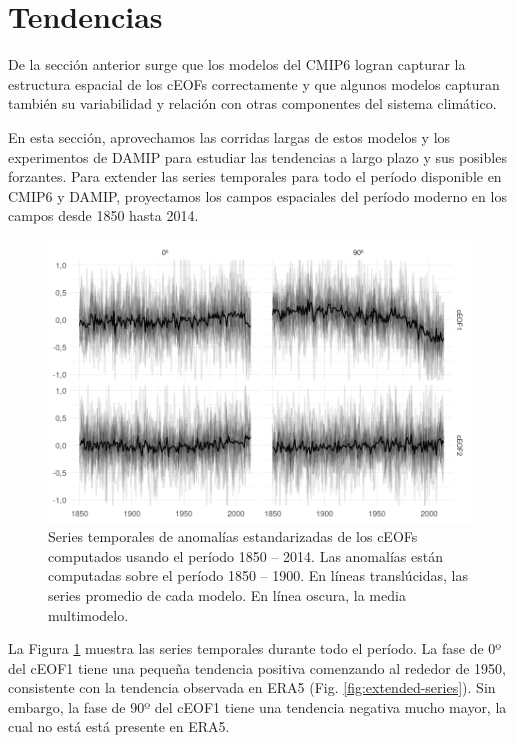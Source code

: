 \documentclass[12pt,oneside,a4paper]{reedthesis}
\begin{document}
\hypertarget{tendencias}{%
\section{Tendencias}\label{tendencias}}

De la sección anterior surge que los modelos del CMIP6 logran capturar la estructura espacial de los cEOFs correctamente y que algunos modelos capturan también su variabilidad y relación con otras componentes del sistema climático.

En esta sección, aprovechamos las corridas largas de estos modelos y los experimentos de DAMIP para estudiar las tendencias a largo plazo y sus posibles forzantes.
Para extender las series temporales para todo el período disponible en CMIP6 y DAMIP, proyectamos los campos espaciales del período moderno en los campos desde 1850 hasta 2014.

\begin{figure}

{\centering \includegraphics{figures/50-cmip6/series-largas-1} 

}

\caption{Series temporales de anomalías estandarizadas de los cEOFs computados usando el período 1850 -- 2014. Las anomalías están computadas sobre el período 1850 -- 1900. En líneas translúcidas, las series promedio de cada modelo. En línea oscura, la media multimodelo.}\label{fig:series-largas}
\end{figure}



La Figura \ref{fig:series-largas} muestra las series temporales durante todo el período.
La fase de 0º del cEOF1 tiene una pequeña tendencia positiva comenzando al rededor de 1950, consistente con la tendencia observada en ERA5 (Fig. \ref{fig:extended-series}).
Sin embargo, la fase de 90º del cEOF1 tiene una tendencia negativa mucho mayor, la cual no está está presente en ERA5.
\end{document}
